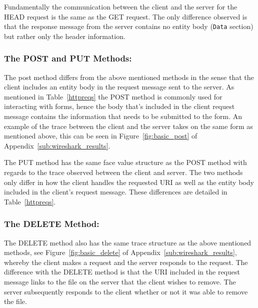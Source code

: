 \documentclass[10pt,twocolumn]{witseiepaper}
\begin{document}
		Fundamentally the communication between the client and the server for the HEAD request is the same as the GET request. The only difference observed is that the response message from the server contains no entity body (\texttt{Data} section) but rather only the header information. 
		
		
		\subsubsection*{The POST and PUT Methods:} The post method differs from the above mentioned methods in the sense that the client includes an entity body in the request message sent to the server. As mentioned in Table~\ref{httpreqs} the POST method is commonly used for interacting with forms, hence the body that's included in the client request message contains the information that needs to be submitted to the form. An example of the trace between the client and the server takes on the same form as mentioned above, this can be seen in Figure~\ref{fig:basic_post} of Appendix~\ref{sub:wireshark_results}.
		
		 The PUT method has the same face value structure as the POST method with regards to the trace observed between the client and server. The two methods only differ in how the client handles the requested URI as well as the entity body included in the client's request message. These differences are detailed in Table~\ref{httpreqs}.
		 
		 \subsubsection*{The DELETE Method:} The DELETE method also has the same trace structure as the above mentioned methods, see Figure~\ref{fig:basic_delete} of Appendix~\ref{sub:wireshark_results}, whereby the client makes a request and the server responds to the request. The difference with the DELETE method is that the URI included in the request message links to the file on the server that the client wishes to remove. The server subsequently responds to the client whether or not it was able to remove the file. 
	 
\end{document}
